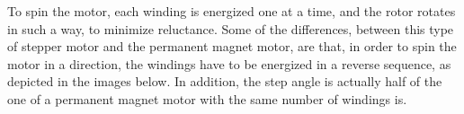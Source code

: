 \begin{figure}[htp] 
    \centering
    \hfill
\end{figure}

To spin the motor, each winding is energized one at a time, and the rotor rotates in such a way, to minimize reluctance. Some of the differences, between this type of stepper motor and the permanent magnet motor, are that, in order to spin the motor in a direction, the windings have to be energized in a reverse sequence, as depicted in the images below. In addition, the step angle is actually half of the one of a permanent magnet motor with the same number of windings is.

